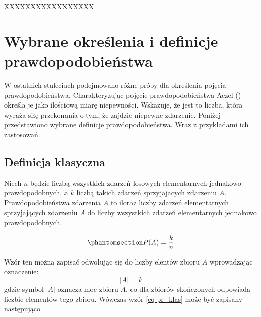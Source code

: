 \documentclass[
  letterpaper,
  DIV=11,
  numbers=noendperiod]{scrreprt}
\begin{document}
\begin{tcolorbox}[enhanced jigsaw, toprule=.15mm, title=\textcolor{quarto-callout-tip-color}{\faLightbulb}\hspace{0.5em}{Przykład 3.6}, breakable, coltitle=black, titlerule=0mm, colbacktitle=quarto-callout-tip-color!10!white, opacitybacktitle=0.6, opacityback=0, bottomtitle=1mm, left=2mm, arc=.35mm, leftrule=.75mm, bottomrule=.15mm, rightrule=.15mm, toptitle=1mm, colframe=quarto-callout-tip-color-frame, colback=white]

\end{tcolorbox}

XXXXXXXXXXXXXXXXX

\section{Wybrane określenia i definicje
prawdopodobieństwa}\label{wybrane-okreux15blenia-i-definicje-prawdopodobieux144stwa}

W ostatnich stuleciach podejmowano różne próby dla określenia pojęcia
prawdopodobieństwa. Charakteryzując pojęcie prawdopodobieństwa Aczel
() określa je jako ilościową miarę
niepewności. Wskazuje, że jest to liczba, która wyraża siłę przekonania
o tym, że zajdzie niepewne zdarzenie. Poniżej przedstawiono wybrane
definicje prawdopodobieństwa. Wraz z przykładami ich zastosowań.

\subsection{Definicja klasyczna}\label{definicja-klasyczna}

Niech \(n\) będzie liczbą wszystkich zdarzeń losowych elementarnych
jednakowo prawdopodobnych, a \(k\) liczbą takich zdarzeń sprzyjajacych
zdarzeniu \(A\). Prawdopodobieństwa zdarzenia \(A\) to iloraz liczby
zdarzeń elementarnych sprzyjających zdarzeniu \(A\) do liczby wszystkich
zdarzeń elementarnych jednakowo prawdopodobnych.

\begin{equation}\phantomsection\label{eq-pr_klas}{ P(A) = \frac{k}{n}}\end{equation}

Wzór ten można zapisać odwołując się do liczby elentów zbioru \(A\)
wprowadzając oznaczenie: \[ |A|=k\] gdzie symbol \(|A|\) oznacza moc
zbioru \(A\), co dla zbiorów skończonych odpowiada liczbie elementów
tego zbioru. Wówczas wzór \ref{eq-pr_klas} może być zapisany następująco
\end{document}

